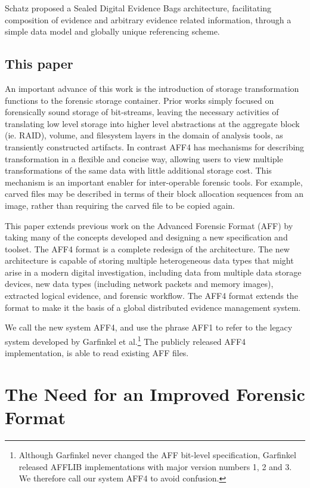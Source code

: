 \documentclass[10pt, conference]{IEEEtran}
\begin{document}
Schatz proposed a Sealed Digital Evidence Bags architecture,
facilitating composition of evidence and arbitrary evidence related
information, through a simple data model and globally unique
referencing scheme\cite{schatz:sdeb}.

\subsection{This paper}
An important advance of this work is the introduction of storage
transformation functions to the forensic storage container. Prior
works simply focused on forensically sound storage of bit-streams,
leaving the necessary activities of translating low level storage into
higher level abstractions at the aggregate block (ie. RAID), volume,
and filesystem layers in the domain of analysis tools, as transiently
constructed artifacts. In contrast AFF4 has mechanisms for describing
transformation in a flexible and concise way, allowing users to view
multiple transformations of the same data with little additional storage
cost. This mechanism is an important enabler for inter-operable
forensic tools. For example, carved files may be described in terms of
their block allocation sequences from an image, rather than requiring
the carved file to be copied again.

This paper extends previous work on the Advanced Forensic Format (AFF)
by taking many of the concepts developed and designing a new
specification and toolset. The AFF4 format is a complete redesign of
the architecture. The new architecture is capable of storing multiple
heterogeneous data types that might arise in a modern digital
investigation, including data from multiple data storage devices, new
data types (including network packets and memory images), extracted
logical evidence, and forensic workflow. The AFF4 format extends the
format to make it the basis of a global distributed evidence management system. 

We call the new system AFF4, and use the phrase AFF1 to refer to the
legacy system developed by Garfinkel et al.\footnote{Although
Garfinkel never changed the AFF bit-level specification, Garfinkel
released AFFLIB implementations with major version numbers 1, 2 and
3. We therefore call our system AFF4 to avoid confusion.} The publicly
released AFF4 implementation, is able to read existing AFF files.

\section{The Need for an Improved Forensic Format}
\end{document}
